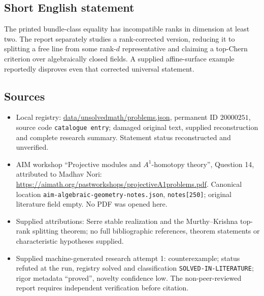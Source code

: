 \documentclass[11pt]{article}
\begin{document}
\subsection{Short English statement}
The printed bundle-class equality has incompatible ranks in dimension at least two. The report separately studies a rank-corrected version, reducing it to splitting a free line from some rank-$d$ representative and claiming a top-Chern criterion over algebraically closed fields. A supplied affine-surface example reportedly disproves even that corrected universal statement.
\subsection{Sources}
\begin{itemize}
\item Local registry: \url{data/unsolvedmath/problems.json}, permanent ID $20000251$, source code \texttt{catalogue entry}; damaged original text, supplied reconstruction and complete research summary. Statement status reconstructed and unverified.
\item AIM workshop ``Projective modules and $A^1$-homotopy theory'', Question 14, attributed to Madhav Nori: \url{https://aimath.org/pastworkshops/projectiveA1problems.pdf}. Canonical location \texttt{aim-algebraic-geometry-notes.json}, \texttt{notes[250]}; original literature field empty. No PDF was opened here.
\item Supplied attributions: Serre stable realization and the Murthy--Krishna top-rank splitting theorem; no full bibliographic references, theorem statements or characteristic hypotheses supplied.
\item Supplied machine-generated research attempt 1: counterexample; status refuted at the run, registry solved and classification \texttt{SOLVED-IN-LITERATURE}; rigor metadata ``proved'', novelty confidence low. The non-peer-reviewed report requires independent verification before citation.
\end{itemize}
\end{document}

